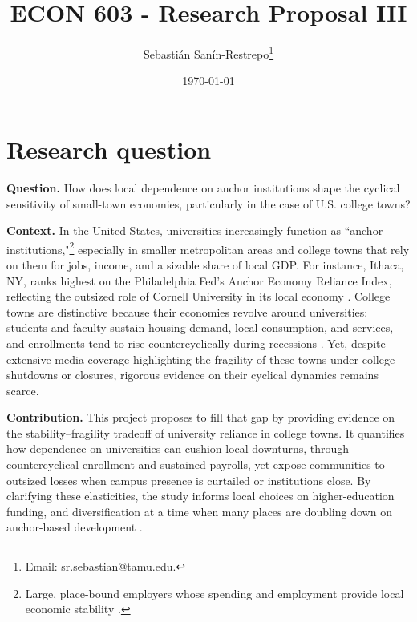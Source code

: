 



\title{\Large \textbf{ECON 603 - Research Proposal III}}

\author{Sebasti\'an San\'in-Restrepo\thanks{Email: sr.sebastian@tamu.edu.}} 
\date{\today}

\maketitle
\thispagestyle{empty} 
\doublespacing
\thispagestyle{empty} 

\vspace{-10mm}

\doublespacing

\section{ Research question}

\noindent \textbf{Question.} How does local dependence on anchor institutions shape the cyclical sensitivity of small-town economies, particularly in the case of U.S. college towns?

\noindent\textbf{Context.} In the United States, universities increasingly function as ``anchor institutions,"\footnote{Large, place-bound employers whose spending and employment provide local economic stability \citep{Harker2024AnchorReliance,Saxenian1994RegionalAdvantage}.} especially in smaller metropolitan areas and college towns that rely on them for jobs, income, and a sizable share of local GDP. For instance, Ithaca, NY, ranks highest on the Philadelphia Fed’s Anchor Economy Reliance Index, reflecting the outsized role of Cornell University in its local economy \citep{Harker2024AnchorReliance}. College towns are distinctive because their economies revolve around universities: students and faculty sustain housing demand, local consumption, and services, and enrollments tend to rise countercyclically during recessions \citep{BoundTurner2007CohortCrowding}. Yet, despite extensive media coverage highlighting the fragility of these towns under college shutdowns or closures, rigorous evidence on their cyclical dynamics remains scarce.

\noindent\textbf{Contribution.} This project proposes to fill that gap by providing evidence on the stability–fragility tradeoff of university reliance in college towns. It quantifies how dependence on universities can cushion local downturns, through countercyclical enrollment and sustained payrolls, yet expose communities to outsized losses when campus presence is curtailed or institutions close. By clarifying these elasticities, the study informs local choices on higher-education funding, and diversification at a time when many places are doubling down on anchor-based development \citep{Harker2024AnchorReliance}.

